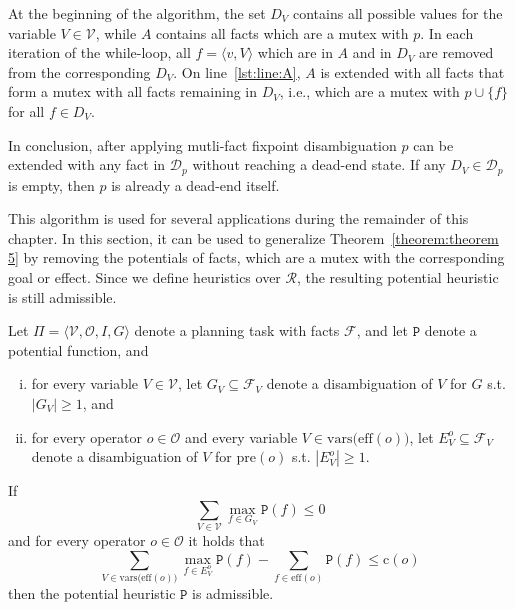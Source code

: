 At the beginning of the algorithm, the set $D_V$ contains all possible values for the variable $V\in\mathcal{V}$, while $A$ contains all facts which are a mutex with $p$.
In each iteration of the while-loop, all $f=\langle v, V\rangle$ which are in $A$ and in $D_V$ are removed from the corresponding $D_V$.
On line~\ref{lst:line:A}, $A$ is extended with all facts that form a mutex with all facts remaining in $D_V$, i.e., which are a mutex with $p\cup\{f\}$ for all $f\in D_V$.

In conclusion, after applying mutli-fact fixpoint disambiguation $p$ can be extended with any fact in $\mathcal{D}_p$ without reaching a dead-end state.
If any $D_V\in\mathcal{D}_p$ is empty, then $p$ is already a dead-end itself.

This algorithm is used for several applications during the remainder of this chapter.
In this section, it can be used to generalize Theorem~\ref{theorem:theorem 5} by removing the potentials of facts, which are a mutex with the corresponding goal or effect.
Since we define heuristics over $\mathcal{R}$, the resulting potential heuristic is still admissible.

\begin{theorem}
    \label{theorem:7}
    Let $\Pi = \langle \mathcal{V}, \mathcal{O}, I, G \rangle$ denote a planning task with facts $\mathcal{F}$, and let $\mathtt{P}$ denote a potential function, and
    \begin{enumerate}[(i)]
        \item for every variable $V\in\mathcal{V}$, let $G_V\subseteq\mathcal{F}_V$ denote a disambiguation of $V$ for $G$ s.t. $|G_V|\geq1$, and
        \item for every operator $o\in\mathcal{O}$ and every variable $V\in\mathrm{vars(eff}(o))$, let $E^o_V\subseteq\mathcal{F}_V $ denote a disambiguation of $V$ for $\mathrm{pre}(o)$ s.t. $|E^o_V|\geq1$.
    \end{enumerate}

    If
    \begin{equation}\sum_{V\in\mathcal{V}}\max_{f\in G_V}\mathtt{P}(f)\leq0\label{eq:3}\end{equation}
    and for every operator $o\in\mathcal{O}$ it holds that
    \begin{equation}\sum_{V\in\mathrm{vars(eff}(o))}\max_{f\in E^o_V}\mathtt{P}(f) - \sum_{f\in\mathrm{eff}(o)}\mathtt{P}(f)\leq\mathrm{c}(o)\label{eq:4}\end{equation}
    then the potential heuristic $\mathtt{P}$ is admissible.
\end{theorem}

